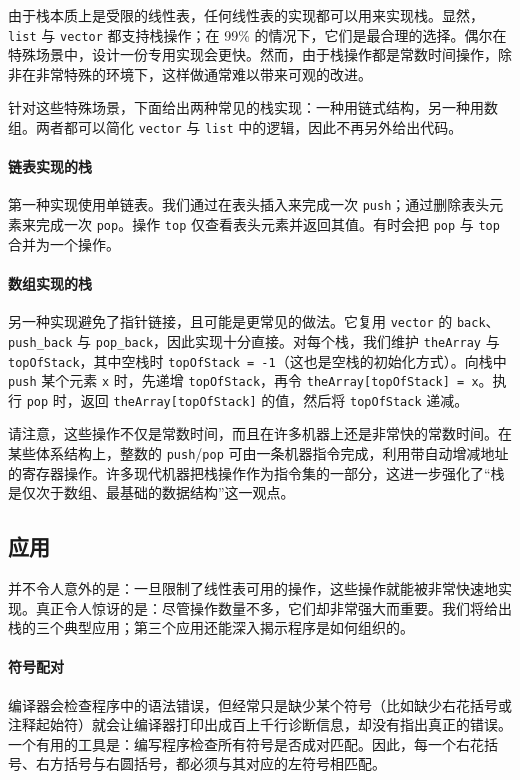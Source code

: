 \documentclass[a4paper]{ctexart}
\theoremstyle{definition}
\theoremstyle{definition}
\begin{document}
\noindent
由于栈本质上是受限的线性表，任何线性表的实现都可以用来实现栈。显然，\texttt{list} 与 \texttt{vector} 都支持栈操作；在 99\% 的情况下，它们是最合理的选择。偶尔在特殊场景中，设计一份专用实现会更快。然而，由于栈操作都是常数时间操作，除非在非常特殊的环境下，这样做通常难以带来可观的改进。

\noindent
针对这些特殊场景，下面给出两种常见的栈实现：一种用链式结构，另一种用数组。两者都可以简化 \texttt{vector} 与 \texttt{list} 中的逻辑，因此不再另外给出代码。

\paragraph{链表实现的栈}
\noindent
第一种实现使用单链表。我们通过在表头插入来完成一次 \texttt{push}；通过删除表头元素来完成一次 \texttt{pop}。操作 \texttt{top} 仅查看表头元素并返回其值。有时会把 \texttt{pop} 与 \texttt{top} 合并为一个操作。

\paragraph{数组实现的栈}
\noindent
另一种实现避免了指针链接，且可能是更常见的做法。它复用 \texttt{vector} 的 \texttt{back}、\texttt{push\_back} 与 \texttt{pop\_back}，因此实现十分直接。对每个栈，我们维护 \texttt{theArray} 与 \texttt{topOfStack}，其中空栈时 \texttt{topOfStack = -1}（这也是空栈的初始化方式）。向栈中 \texttt{push} 某个元素 \texttt{x} 时，先递增 \texttt{topOfStack}，再令 \texttt{theArray[topOfStack] = x}。执行 \texttt{pop} 时，返回 \texttt{theArray[topOfStack]} 的值，然后将 \texttt{topOfStack} 递减。

\noindent
请注意，这些操作不仅是常数时间，而且在许多机器上还是非常快的常数时间。在某些体系结构上，整数的 \texttt{push}/\texttt{pop} 可由一条机器指令完成，利用带自动增减地址的寄存器操作。许多现代机器把栈操作作为指令集的一部分，这进一步强化了“栈是仅次于数组、最基础的数据结构”这一观点。

\subsection{应用}

\noindent
并不令人意外的是：一旦限制了线性表可用的操作，这些操作就能被非常快速地实现。真正令人惊讶的是：尽管操作数量不多，它们却非常强大而重要。我们将给出栈的三个典型应用；第三个应用还能深入揭示程序是如何组织的。

\paragraph{符号配对}
\noindent
编译器会检查程序中的语法错误，但经常只是缺少某个符号（比如缺少右花括号或注释起始符）就会让编译器打印出成百上千行诊断信息，却没有指出真正的错误。一个有用的工具是：编写程序检查所有符号是否成对匹配。因此，每一个右花括号、右方括号与右圆括号，都必须与其对应的左符号相匹配。


\end{document}
